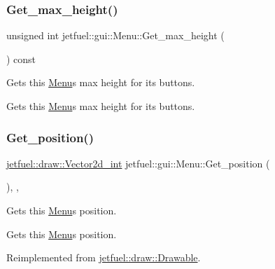 \subsubsection{\texorpdfstring{Get\+\_\+max\+\_\+height()}{Get\_max\_height()}}
{\footnotesize\ttfamily unsigned int jetfuel\+::gui\+::\+Menu\+::\+Get\+\_\+max\+\_\+height (\begin{DoxyParamCaption}{ }\end{DoxyParamCaption}) const\hspace{0.3cm}{\ttfamily [inline]}}



Gets this \hyperlink{classjetfuel_1_1gui_1_1Menu}{Menu}\textquotesingle{}s max height for it\textquotesingle{}s buttons. 

Gets this \hyperlink{classjetfuel_1_1gui_1_1Menu}{Menu}\textquotesingle{}s max height for it\textquotesingle{}s buttons. \mbox{\label{classjetfuel_1_1gui_1_1Menu_ac1aebb753feba17be808f2068ff17e74}} 
\subsubsection{\texorpdfstring{Get\+\_\+position()}{Get\_position()}}
{\footnotesize\ttfamily \hyperlink{classjetfuel_1_1draw_1_1Vector2d}{jetfuel\+::draw\+::\+Vector2d\+\_\+int} jetfuel\+::gui\+::\+Menu\+::\+Get\+\_\+position (\begin{DoxyParamCaption}{ }\end{DoxyParamCaption})\hspace{0.3cm}{\ttfamily [inline]}, {\ttfamily [override]}, {\ttfamily [virtual]}}



Gets this \hyperlink{classjetfuel_1_1gui_1_1Menu}{Menu}\textquotesingle{}s position. 

Gets this \hyperlink{classjetfuel_1_1gui_1_1Menu}{Menu}\textquotesingle{}s position. 

Reimplemented from \hyperlink{classjetfuel_1_1draw_1_1Drawable_ae7ebd30d66db2c8a5d5371cbcf0023fc}{jetfuel\+::draw\+::\+Drawable}.

\mbox{\label{classjetfuel_1_1gui_1_1Menu_a1d5c050dcad48008898eafe2d610eff6}} 
